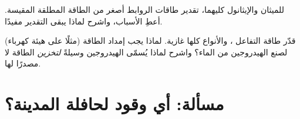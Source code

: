 \begin{exercise}[$\star\star\star$]\label{exo:g11:reaction-energy:14}
للميثان والإيثانول كليهما، تقدير طاقات الروابط أصغر من
الطاقة المطلقة المقيسة. أعطِ الأسباب، واشرح لماذا يبقى
التقدير مفيدًا.
\end{exercise}

\begin{exercise}[$\star\star\star$]\label{exo:g11:reaction-energy:15}
قدّر طاقة التفاعل ، والأنواع كلها غازية. لماذا يجب
إمداد الطاقة (مثلًا على هيئة كهرباء) لصنع الهيدروجين من الماء؟
واشرح لماذا يُسمّى الهيدروجين وسيلةً \emph{لتخزين} الطاقة لا
مصدرًا لها.
\end{exercise}

\section{مسألة: أي وقود لحافلة المدينة؟}

